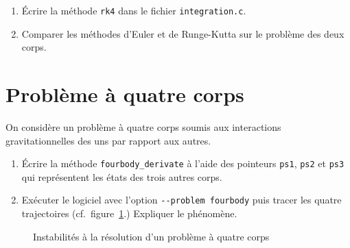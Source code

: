 \documentclass[twoside, symmetric]{tufte-handout}
\begin{document}
\begin{enumerate}
    \item Écrire la méthode \texttt{rk4} dans le fichier \texttt{integration.c}.
    \item Comparer les méthodes d'Euler et de Runge-Kutta sur le problème des
        deux corps.
\end{enumerate}

\section{Problème à quatre corps}

On considère un problème à quatre corps soumis aux interactions
gravitationnelles des uns par rapport aux autres.

\begin{enumerate}
    \item Écrire la méthode \texttt{fourbody\_derivate} à l'aide des pointeurs
        \texttt{ps1}, \texttt{ps2} et \texttt{ps3} qui représentent les états
        des trois autres corps.
    \item Exécuter le logiciel avec l'option \verb+--problem fourbody+ puis
        tracer les quatre trajectoires (cf.\ figure~\ref{fig:4body}.) Expliquer
        le phénomène.
\end{enumerate}

\begin{figure}[h]
    \centering

    \caption{Instabilités à la résolution d'un problème à quatre corps}
    \label{fig:4body}
\end{figure}
\end{document}

